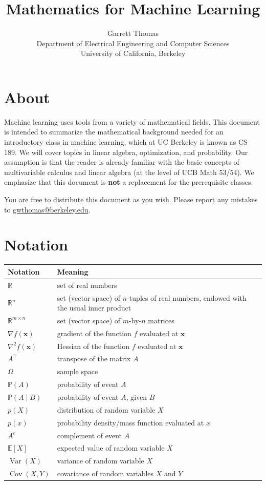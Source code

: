 \documentclass{article}
\title{Mathematics for Machine Learning}
\author{Garrett Thomas\\
Department of Electrical Engineering and Computer Sciences\\
University of California, Berkeley}
\newcommand{\R}{\mathbb{R}}
\renewcommand{\vec}[1]{\mathbf{#1}}
\newcommand{\tran}{^\top}
\newcommand{\pr}[1]{\mathbb{P}(#1)}
\renewcommand{\ev}[1]{\mathbb{E}[#1]}
\renewcommand{\var}[1]{\operatorname{Var}(#1)}
\newcommand{\cov}[2]{\operatorname{Cov}(#1, #2)}
\begin{document}
\maketitle

\section{About}
Machine learning uses tools from a variety of mathematical fields. This document is intended to summarize the mathematical background needed for an introductory class in machine learning, which at UC Berkeley is known as CS 189. We will cover topics in linear algebra, optimization, and probability. Our assumption is that the reader is already familiar with the basic concepts of multivariable calculus and linear algebra (at the level of UCB Math 53/54). We emphasize that this document is \textbf{not} a replacement for the prerequisite classes.

You are free to distribute this document as you wish. Please report any mistakes to \url{gwthomas@berkeley.edu}.

\newpage
\tableofcontents

\newpage
\section{Notation}
\begin{tabular}{|l|l|}
\hline
Notation & Meaning \\
\hline
$\R$ & set of real numbers \\
$\R^n$ & set (vector space) of $n$-tuples of real numbers, endowed with the usual inner product \\
$\R^{m \times n}$ & set (vector space) of $m$-by-$n$ matrices \\
$\nabla f(\vec{x})$ & gradient of the function $f$ evaluated at $\vec{x}$ \\
$\nabla^2 f(\vec{x})$ & Hessian of the function $f$ evaluated at $\vec{x}$ \\
$A\tran$ & transpose of the matrix $A$ \\
$\Omega$ & sample space \\
$\pr{A}$ & probability of event $A$ \\
$\pr{A \mid B}$ & probability of event $A$, given $B$ \\
$p(X)$ & distribution of random variable $X$ \\
$p(x)$ & probability density/mass function evaluated at $x$ \\
$A^c$ & complement of event $A$ \\
$\ev{X}$ & expected value of random variable $X$ \\
$\var{X}$ & variance of random variable $X$ \\
$\cov{X}{Y}$ & covariance of random variables $X$ and $Y$ \\
\hline
\end{tabular}
\end{document}
